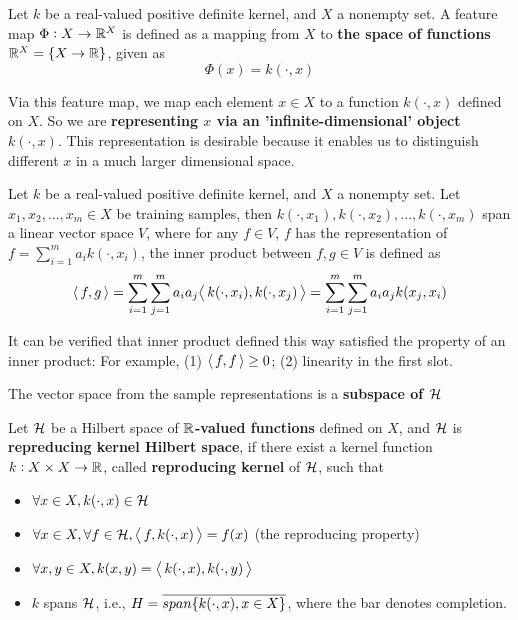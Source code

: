 \begin{refsection}
\begin{definition}
	\cite[32]{scholkopf2002learning}Let $k$ be a real-valued positive definite kernel, and $X$ a nonempty set. A feature map $\Phi: X\to \mathbb{R}^X$ is defined as a mapping from $X$ to \textbf{the space of functions }$\mathbb{R}^X = \{X\to \mathbb{R}\}$, given as
	$$\Phi(x) = k(\cdot,x)$$
\end{definition}


\begin{remark}
	Via this feature map, we map each element $x\in X$ to a function $k(\cdot,x)$ defined on $X$. So we are \textbf{representing $x$ via an 'infinite-dimensional' object $k(\cdot,x)$}. This representation is desirable because it enables us to distinguish different $x$ in a much larger dimensional space.
\end{remark}


\begin{definition}
	Let $k$ be a real-valued positive definite kernel, and $X$ a nonempty set. Let $x_1,x_2,...,x_m \in X$ be training samples, then $k(\cdot,x_1),k(\cdot,x_2),...,k(\cdot,x_m)$ span a linear vector space $V$, where for any $f\in V$, $f$ has the representation of $f = \sum_{i=1}^m a_i k(\cdot,x_i)$, the inner product between $f,g\in V$ is defined as
	$${\left< \, f,g \, \right>} = \sum_{i=1}^m\sum_{j=1}^m a_ia_j {\left< \, k(\cdot,x_i),k(\cdot,x_j) \, \right>} = \sum_{i=1}^m\sum_{j=1}^m a_ia_j k(x_j,x_i)$$
\end{definition}

\begin{remark}
	It can be verified that inner product defined this way satisfied the property of an inner product: For example, (1) ${\left< \, f,f \, \right>} \geq 0$; (2) linearity in the first slot. 
\end{remark}

\begin{remark}
	The vector space from the sample representations is a \textbf{subspace of $\mathcal{H}$}
\end{remark}


\begin{definition}
	Let $\mathcal{H}$ be a Hilbert space of \textbf{$\mathbb{R}$-valued functions} defined on $X$, and $\mathcal{H}$ is \textbf{repreducing kernel Hilbert space}, if there exist a kernel function $k:X\times X\to \mathbb{R}$, called \textbf{reproducing kernel} of $\mathcal{H}$, such that
	\begin{itemize}
		\item $\forall x \in X, k(\cdot,x) \in \mathcal{H}$
		\item $\forall x \in X,\forall f \in \mathcal{H}, {\left< \, f,k(\cdot,x) \, \right>} = f(x)$ (the reproducing property)
		\item $\forall x,y \in X, k(x,y) = {\left< \, k(\cdot,x),k(\cdot,y) \, \right>}$
		\item $k$ spans $\mathcal{H}$, i.e., $H = \overline{span\{k(\cdot,x),x\in X\}}$, where the bar denotes completion.
	\end{itemize}
\end{definition}


\end{refsection}
